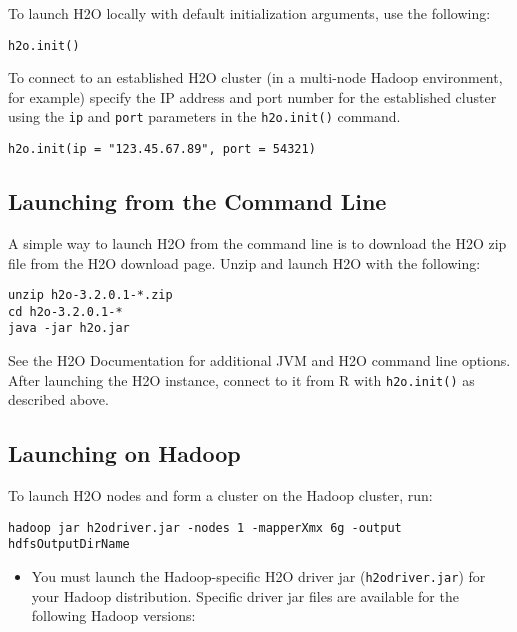 {{To launch H2O locally with default initialization arguments, use the following:
\begin{lstlisting}[style=R]
h2o.init()
\end{lstlisting}

To connect to an established H2O cluster (in a multi-node Hadoop environment, for example) specify the IP address and port number for the established cluster using the \texttt{ip} and \texttt{port} parameters in the \texttt{h2o.init()} command. 
\medskip  

\begin{lstlisting}[style=R]
h2o.init(ip = "123.45.67.89", port = 54321)
\end{lstlisting}

\subsection{Launching from the Command Line}

A simple way to launch H2O from the command line is to download the H2O zip file from the H2O download page. Unzip and
launch H2O with the following:
\begin{lstlisting}[style=R]
unzip h2o-3.2.0.1-*.zip
cd h2o-3.2.0.1-*
java -jar h2o.jar
\end{lstlisting}
See the H2O Documentation for additional JVM and H2O command line options.
After launching the H2O instance, connect to it from R with {\texttt{h2o.init()}} as described above.

\newpage
\subsection{Launching on Hadoop}

To launch H2O nodes and form a cluster on the Hadoop cluster, run:

\begin{lstlisting}[style=R]
hadoop jar h2odriver.jar -nodes 1 -mapperXmx 6g -output hdfsOutputDirName

\end{lstlisting}

\begin{itemize}
\item You must launch the Hadoop-specific H2O driver jar (\texttt{h2odriver.jar}) for your Hadoop distribution. Specific driver jar files are available for the following Hadoop versions:

\begin{frame}%


\end{frame}
\end{itemize}}}
